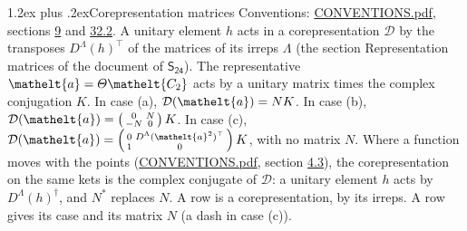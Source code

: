 \documentclass[10pt,a4paper]{article}
\makeatletter
\renewcommand\section{\@startsection{section}{1}{\z@}{-3ex plus -1ex minus -.2ex}%
  {1.2ex plus .2ex}{\normalfont\large\sffamily\bfseries\color{parttitle}}}
\numberwithin{equation}{section}
\newcommand{\eltfont}[1]{{\let\sigma\eltsigma\mathelt{#1}}}
\newcommand{\grp}[1]{\mathsf{#1}}
\newcommand{\elt}[1]{\eltfont{#1}}
\makeatother
\begin{document}
\section{Corepresentation matrices}\label{s:corep_matrices}
Conventions: \href{../../CONVENTIONS.pdf}{CONVENTIONS.pdf}, sections \href{../../../rotation/CONVENTIONS.pdf\#conv.9}{9} and \href{../../CONVENTIONS.pdf\#conv.32.2}{32.2}.
A unitary element $h$ acts in a corepresentation $\mathcal{D}$ by the transposes $D^{\Lambda}(h)^{\top}$ of the matrices of its irreps $\Lambda$ (the section Representation matrices of the document of \href{../../../rotation/data/pdf/S24.pdf}{$\grp{S_{24}}$}). The representative $\elt{a} = \varTheta\elt{C_{2}}$ acts by a unitary matrix times the complex conjugation $K$.
In case (a), $\mathcal{D}(\elt{a}) = NK$. In case (b), $\mathcal{D}(\elt{a}) = \left(\begin{smallmatrix} 0 & N \\ -N & 0 \end{smallmatrix}\right) K$. In case (c), $\mathcal{D}(\elt{a}) = \left(\begin{smallmatrix} 0 & D^{\Lambda}(\elt{a}^2)^{\top} \\ 1 & 0 \end{smallmatrix}\right) K$, with no matrix $N$.
Where a function moves with the points (\href{../../CONVENTIONS.pdf}{CONVENTIONS.pdf}, section \href{../../../rotation/CONVENTIONS.pdf\#conv.4.3}{4.3}), the corepresentation on the same kets is the complex conjugate of $\mathcal{D}$: a unitary element $h$ acts by $D^{\Lambda}(h)^{\dagger}$, and $N^{*}$ replaces $N$.
A row is a corepresentation, by its irreps. A row gives its case and its matrix $N$ (a dash in case (c)).
\end{document}

